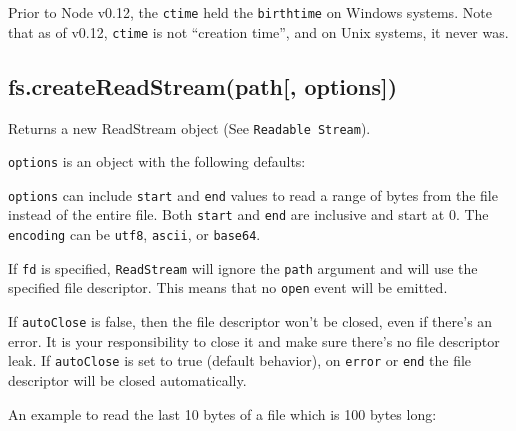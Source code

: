Prior to Node v0.12, the \texttt{ctime} held the \texttt{birthtime} on
Windows systems. Note that as of v0.12, \texttt{ctime} is not ``creation
time'', and on Unix systems, it never was.

\subsection{fs.createReadStream(path{[},
options{]})}\label{fs.createreadstreampath-options}

Returns a new ReadStream object (See \texttt{Readable\ Stream}).

\texttt{options} is an object with the following defaults:

\begin{Shaded}
\begin{Highlighting}[]
\NormalTok{\{ }\NormalTok{: }\NormalTok{,}
  \NormalTok{: }\NormalTok{,}
  \NormalTok{: }\NormalTok{,}
  \NormalTok{: }\NormalTok{,}
  \NormalTok{: }
\NormalTok{\}}
\end{Highlighting}
\end{Shaded}

\texttt{options} can include \texttt{start} and \texttt{end} values to
read a range of bytes from the file instead of the entire file. Both
\texttt{start} and \texttt{end} are inclusive and start at 0. The
\texttt{encoding} can be
\texttt{\textquotesingle{}utf8\textquotesingle{}},
\texttt{\textquotesingle{}ascii\textquotesingle{}}, or
\texttt{\textquotesingle{}base64\textquotesingle{}}.

If \texttt{fd} is specified, \texttt{ReadStream} will ignore the
\texttt{path} argument and will use the specified file descriptor. This
means that no \texttt{open} event will be emitted.

If \texttt{autoClose} is false, then the file descriptor won't be
closed, even if there's an error. It is your responsibility to close it
and make sure there's no file descriptor leak. If \texttt{autoClose} is
set to true (default behavior), on \texttt{error} or \texttt{end} the
file descriptor will be closed automatically.

An example to read the last 10 bytes of a file which is 100 bytes long:

\begin{Shaded}
\begin{Highlighting}[]
\NormalTok{(}\NormalTok{, \{}\NormalTok{: }\NormalTok{, }\NormalTok{: }\NormalTok{\});}
\end{Highlighting}
\end{Shaded}

